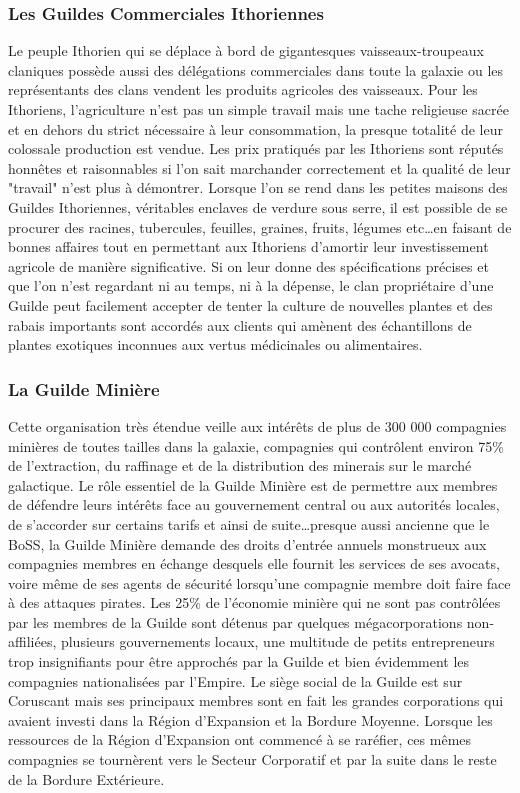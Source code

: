 \documentclass[twoside]{article}
\begin{document}
\subsubsection{Les Guildes Commerciales Ithoriennes}
Le peuple Ithorien qui se déplace à bord de gigantesques vaisseaux-troupeaux claniques possède aussi des délégations commerciales dans toute la galaxie ou les représentants des clans vendent les produits agricoles des vaisseaux. Pour les Ithoriens, l'agriculture n'est pas un simple travail mais une tache religieuse sacrée et en dehors du strict nécessaire à leur consommation, la presque totalité de leur colossale production est vendue. Les prix pratiqués par les Ithoriens sont réputés honnêtes et raisonnables si l'on sait marchander correctement et la qualité de leur "travail" n'est plus à démontrer. Lorsque l'on se rend dans les petites maisons des Guildes Ithoriennes, véritables enclaves de verdure sous serre, il est possible de se procurer des racines, tubercules, feuilles, graines, fruits, légumes etc\ldots en faisant de bonnes affaires tout en permettant aux Ithoriens d'amortir leur investissement agricole de manière significative. Si on leur donne des spécifications précises et que l'on n'est regardant ni au temps, ni à la dépense, le clan propriétaire d'une Guilde peut facilement accepter de tenter la culture de nouvelles plantes et des rabais importants sont accordés aux clients qui amènent des échantillons de plantes exotiques inconnues aux vertus médicinales ou alimentaires.

\subsubsection{La Guilde Minière}
Cette organisation très étendue veille aux intérêts de plus de 300 000 compagnies minières de toutes tailles dans la galaxie, compagnies qui contrôlent environ 75\% de l'extraction, du raffinage et de la distribution des minerais sur le marché galactique. Le rôle essentiel de la Guilde Minière est de permettre aux membres de défendre leurs intérêts face au gouvernement central ou aux autorités locales, de s'accorder sur certains tarifs et ainsi de suite\ldots presque aussi ancienne que le BoSS, la Guilde Minière demande des droits d'entrée annuels monstrueux aux compagnies membres en échange desquels elle fournit les services de ses avocats, voire même de ses agents de sécurité lorsqu'une compagnie membre doit faire face à des attaques pirates. Les 25\% de l'économie minière qui ne sont pas contrôlées par les membres de la Guilde sont détenus par quelques mégacorporations non-affiliées, plusieurs gouvernements locaux, une multitude de petits entrepreneurs trop insignifiants pour être approchés par la Guilde et bien évidemment les compagnies nationalisées par l'Empire. Le siège social de la Guilde est sur Coruscant mais ses principaux membres sont en fait les grandes corporations qui avaient investi dans la Région d'Expansion et la Bordure Moyenne. Lorsque les ressources de la Région d'Expansion ont commencé à se raréfier, ces mêmes compagnies se tournèrent vers le Secteur Corporatif et par la suite dans le reste de la Bordure Extérieure. 
\end{document}
